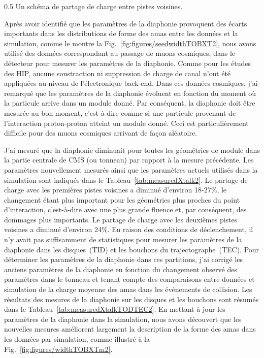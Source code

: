                  {0.5}       %
                 {Un schéma de partage de charge entre pistes voisines. }


Après avoir identifié que les paramètres de la diaphonie provoquent des écarts importants dans les distributions de forme des amas entre les données et la simulation, comme le montre la Fig.~\ref{fig:figures/seedwidthTOBXT2}, nous avons utilisé des données correspondant au passage de muons cosmiques, dans le détecteur  pour mesurer les paramètres de la diaphonie. Comme pour les études des HIP, aucune soustraction ni suppression de charge de canal n’ont été appliquées au niveau de l’électronique back-end. Dans ces données cosmiques, j'ai remarqué que les paramètres de la diaphonie évoluent en fonction du moment où la particule arrive dans un module donné. Par conséquent, la diaphonie doit être mesurée au bon moment, c'est-à-dire comme si une particule provenant de l'interaction proton-proton atteint un module donné. Ceci est particulièrement difficile pour des muons cosmiques arrivant de façon aléatoire.

J'ai mesuré que la diaphonie diminuait pour toutes les géométries de module dans la partie centrale de CMS (ou tonneau) par rapport à la mesure précédente. Les paramètres nouvellement mesurés ainsi que les paramètres actuels utilisés dans la simulation sont indiqués dans le Tableau~\ref{tab:measuredXtalk2}. Le partage de charge avec les premières pistes voisines a diminué d'environ 18-27\%, le changement étant plus important pour les géométries plus proches du point d'interaction, c'est-à-dire avec une plus grande fluence et, par conséquent, des dommages plus importants. Le partage de charge avec les deuxièmes pistes voisines a diminué d'environ 24\%. En raison des conditions de déclenchement, il n'y avait pas suffisamment de statistiques pour mesurer les paramètres de la diaphonie dans les disques~(TID) et les bouchons du trajectographe~(TEC). Pour déterminer les paramètres de la diaphonie dans ces partitions, j'ai corrigé les anciens paramètres de la diaphonie en fonction du changement observé des paramètres dans le tonneau et tenant compte des comparaisons entre  données et simulation de la charge moyenne des amas dans les événements de collision. Les résultats des mesures de la diaphonie sur les disques et les bouchons sont résumés dans le Tableau~\ref{tab:measuredXtalkTODTEC2}. En mettant à jour les paramètres de la diaphonie dans la simulation, nous avons découvert que les nouvelles mesures améliorent largement la description de la forme des amas dans les données par simulation, comme illustré à la Fig.~\ref{fig:figures/widthTOBXTm2}.

